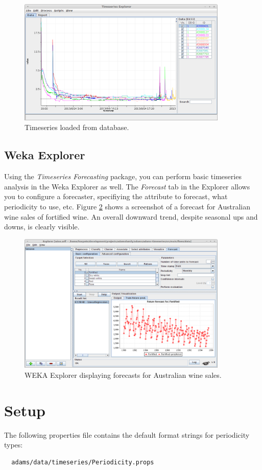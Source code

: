 \documentclass[a4paper]{book}
\begin{document}
\begin{figure}[htb]
  \centering
  \includegraphics[width=10.0cm]{images/timeseries_db_wizard_5.png}
  \caption{Timeseries loaded from database.}
  \label{timeseries_db_wizard_5}
\end{figure}

\clearpage
\section{Weka Explorer}
Using the \textit{Timeseries Forecasting} package\cite{wekatimeseries}, you 
can perform basic timeseries analysis in the Weka Explorer as well. The
\textit{Forecast} tab in the Explorer allows you to configure a forecaster, 
specifiying the attribute to forecast, what periodicity to use, etc. Figure
\ref{weka-timeseries} shows a screenshot of a forecast for Australian wine
sales of fortified wine. An overall downward trend, despite seasonal ups and 
downs, is clearly visible.

\begin{figure}[htb]
  \centering
  \includegraphics[width=10.0cm]{images/weka-timeseries.png}
  \caption{WEKA Explorer displaying forecasts for Australian wine sales.}
  \label{weka-timeseries}
\end{figure}

\chapter{Setup}
The following properties file contains the default format strings for
periodicity types:
\begin{verbatim}
  adams/data/timeseries/Periodicity.props
\end{verbatim}


\end{document}

